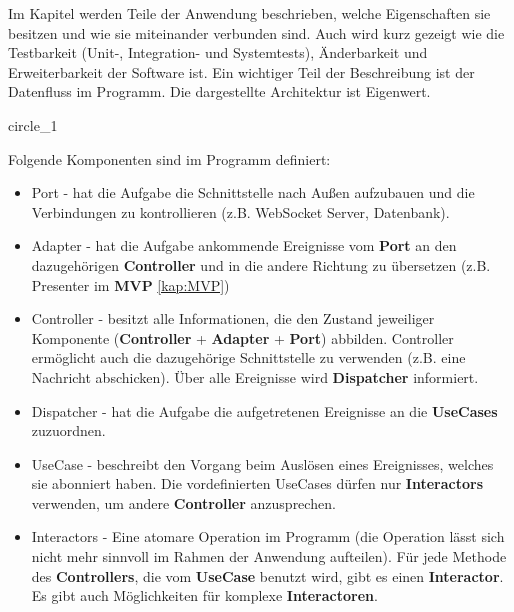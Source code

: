 Im Kapitel werden Teile der Anwendung beschrieben, welche Eigenschaften sie besitzen und wie sie miteinander verbunden sind.
Auch wird kurz gezeigt wie die Testbarkeit (Unit-, Integration- und Systemtests), 
Änderbarkeit und Erweiterbarkeit der Software ist.    
Ein wichtiger Teil der Beschreibung ist der Datenfluss im Programm.
Die dargestellte Architektur ist Eigenwert.

{circle_1}

Folgende Komponenten sind im Programm definiert:
\begin{itemize}
    \item Port - hat die Aufgabe die Schnittstelle nach Außen aufzubauen und die Verbindungen zu kontrollieren (z.B. WebSocket Server, Datenbank).
    \item Adapter  - hat die Aufgabe ankommende Ereignisse vom \textbf{Port} an den dazugehörigen \textbf{Controller} 
    und in die andere Richtung zu übersetzen (z.B. Presenter im \textbf{MVP} \ref{kap:MVP})
    \item Controller - besitzt alle Informationen, die den Zustand jeweiliger Komponente (\textbf{Controller} + \textbf{Adapter} + \textbf{Port}) abbilden.
    Controller ermöglicht auch die dazugehörige Schnittstelle zu verwenden (z.B. eine Nachricht abschicken).
    Über alle Ereignisse wird \textbf{Dispatcher} informiert.
    \item Dispatcher - hat die Aufgabe die aufgetretenen Ereignisse an die \textbf{UseCases} zuzuordnen.
    \item UseCase - beschreibt den Vorgang beim Auslösen eines Ereignisses, welches sie abonniert haben. Die
    vordefinierten UseCases dürfen nur \textbf{Interactors} verwenden, um andere \textbf{Controller} anzusprechen.
    \item Interactors - Eine atomare Operation im Programm (die Operation lässt sich nicht mehr sinnvoll im Rahmen
    der Anwendung aufteilen). Für jede Methode des \textbf{Controllers}, 
    die vom \textbf{UseCase} benutzt wird, gibt es einen \textbf{Interactor}. Es gibt auch Möglichkeiten für komplexe \textbf{Interactoren}.
\end{itemize}
